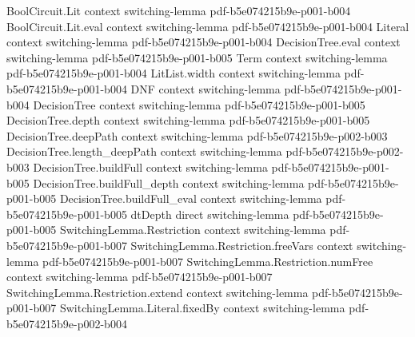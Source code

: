 \begin{lemma}
\label{SwitchingBernoulli.switching_fixedSize_bound_rescaled}
\leanok
{}
\proofstep
  {BoolCircuit.Lit}
  {context}
  {switching-lemma}
  {pdf-b5e074215b9e-p001-b004}
\proofstep
  {BoolCircuit.Lit.eval}
  {context}
  {switching-lemma}
  {pdf-b5e074215b9e-p001-b004}
\proofstep
  {Literal}
  {context}
  {switching-lemma}
  {pdf-b5e074215b9e-p001-b004}
\proofstep
  {DecisionTree.eval}
  {context}
  {switching-lemma}
  {pdf-b5e074215b9e-p001-b005}
\proofstep
  {Term}
  {context}
  {switching-lemma}
  {pdf-b5e074215b9e-p001-b004}
\proofstep
  {LitList.width}
  {context}
  {switching-lemma}
  {pdf-b5e074215b9e-p001-b004}
\proofstep
  {DNF}
  {context}
  {switching-lemma}
  {pdf-b5e074215b9e-p001-b004}
\proofstep
  {DecisionTree}
  {context}
  {switching-lemma}
  {pdf-b5e074215b9e-p001-b005}
\proofstep
  {DecisionTree.depth}
  {context}
  {switching-lemma}
  {pdf-b5e074215b9e-p001-b005}
\proofstep
  {DecisionTree.deepPath}
  {context}
  {switching-lemma}
  {pdf-b5e074215b9e-p002-b003}
\proofstep
  {DecisionTree.length_deepPath}
  {context}
  {switching-lemma}
  {pdf-b5e074215b9e-p002-b003}
\proofstep
  {DecisionTree.buildFull}
  {context}
  {switching-lemma}
  {pdf-b5e074215b9e-p001-b005}
\proofstep
  {DecisionTree.buildFull_depth}
  {context}
  {switching-lemma}
  {pdf-b5e074215b9e-p001-b005}
\proofstep
  {DecisionTree.buildFull_eval}
  {context}
  {switching-lemma}
  {pdf-b5e074215b9e-p001-b005}
\proofstep
  {dtDepth}
  {direct}
  {switching-lemma}
  {pdf-b5e074215b9e-p001-b005}
\proofstep
  {SwitchingLemma.Restriction}
  {context}
  {switching-lemma}
  {pdf-b5e074215b9e-p001-b007}
\proofstep
  {SwitchingLemma.Restriction.freeVars}
  {context}
  {switching-lemma}
  {pdf-b5e074215b9e-p001-b007}
\proofstep
  {SwitchingLemma.Restriction.numFree}
  {context}
  {switching-lemma}
  {pdf-b5e074215b9e-p001-b007}
\proofstep
  {SwitchingLemma.Restriction.extend}
  {context}
  {switching-lemma}
  {pdf-b5e074215b9e-p001-b007}
\proofstep
  {SwitchingLemma.Literal.fixedBy}
  {context}
  {switching-lemma}
  {pdf-b5e074215b9e-p002-b004}

\end{lemma}
